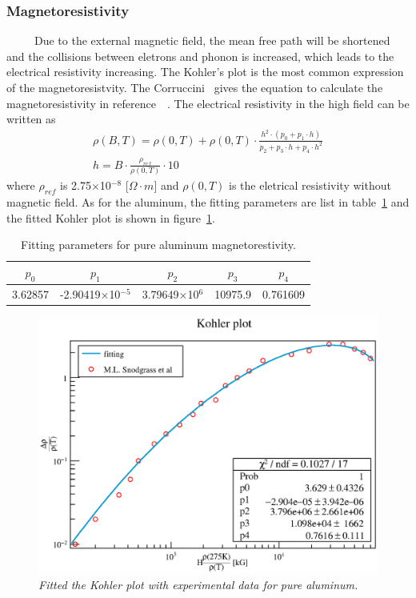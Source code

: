   \subsubsection{Magnetoresistivity}
~~~~~Due to the external magnetic field, the mean free path will be shortened and the collisions between eletrons and phonon is increased, which leads to the electrical resistivity increasing.
The Kohler's plot is the most common expression of the magnetoresistvity.
The Corruccini~\cite{corr} gives the equation to calculate the magnetoresistivity in reference~\cite{fick}~\cite{arp}.
The electrical resistivity in the high field can be written as
\begin{gather}
 \rho(B, T) = \rho(0, T) + \rho(0, T) \cdot \frac{h^2 \cdot (p_0 + p_1 \cdot h)}{p_2 + p_3\cdot h + p_4 \cdot h^2} \\
 h = B \cdot \frac{\rho_{ref}}{\rho(0, T)} \cdot 10
\end{gather}
where $\rho_{ref}$ is 2.75$\times$10$^{-8}$ [$\Omega\cdot m$] and $\rho(0, T)$ is the eletrical resistivity without magnetic field.
As for the aluminum, the fitting parameters are list in table~\ref{almag} and the fitted Kohler plot is shown in figure~\ref{4magres}.
\begin{table}[H]
 \centering
 \begin{tabular}{ccccc} \hline \hline
  $p_0$ & $p_1$ & $p_2$ & $p_3$ & $p_4$ \\ \hline
  3.62857 & -2.90419$\times$10$^{-5}$ & 3.79649$\times$10$^6$ & 10975.9 & 0.761609 \\ \hline \hline
 \end{tabular}
 \caption{Fitting parameters for pure aluminum magnetorestivity.}
 \label{almag}
\end{table}

\begin{figure}[H]
 \centering
 \includegraphics[scale=0.45]{chapter5/fig/Magnetores.eps}
 \caption{\it Fitted the Kohler plot with experimental data for pure aluminum.}
 \label{4magres}
\end{figure}

